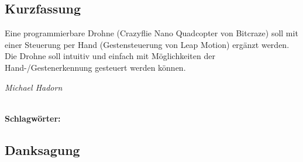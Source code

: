 
\subsection*{Kurzfassung}
Eine programmierbare Drohne (Crazyflie Nano Quadcopter von Bitcraze) soll mit einer Steuerung per Hand (Gestensteuerung von Leap Motion) ergänzt werden. Die Drohne soll intuitiv und einfach mit Möglichkeiten der Hand-/Gestenerkennung gesteuert werden können.
\begin{flushright}
	\textit{Michael Hadorn}	
\end{flushright}

%
\mbox{}\\[0.5\baselineskip]\noindent
\textbf{Schlagwörter:} 

\vfill
\subsection*{Danksagung}
